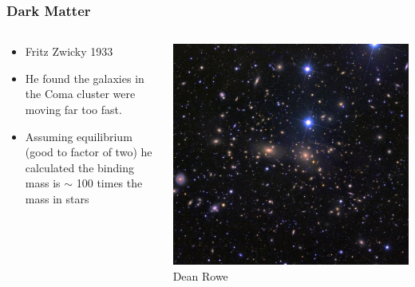 \documentclass{beamer}
\begin{document}
\frame
{
    \frametitle{Dark Matter}

    \begin{columns}
        \begin{column}{0.5\textwidth}    
            \begin{itemize}

                \item Fritz Zwicky 1933

                \item He found the galaxies in the Coma cluster were moving far
                    too fast.

                \item Assuming equilibrium (good to factor of two) he calculated
                    the binding mass is $\sim$ 100 times the mass in stars

            \end{itemize}
        \end{column}
        \begin{column}{0.5\textwidth}
            \begin{center}
                \includegraphics[width=\textwidth]{comacluster_rowe_big_crop.jpg}
                \newline
                {\tiny Dean Rowe}
            \end{center}
        \end{column}
    \end{columns}
}
\end{document}
